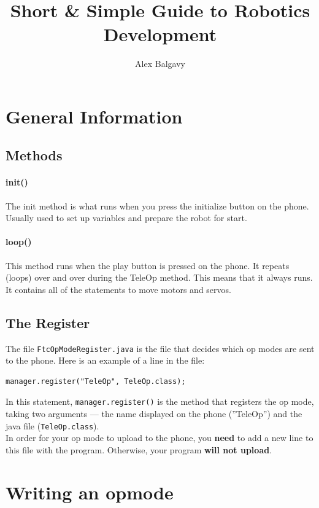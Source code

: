 \documentclass[12p,a4paper]{article}
\title{Short \& Simple Guide to Robotics Development}
\author{Alex Balgavy}
\begin{document}
\maketitle
\newpage
\tableofcontents
\newpage

\section{General Information}
\subsection{Methods}
\paragraph{init()}
The init method is what runs when you press the initialize button on the phone. Usually used to set up variables and prepare the robot for start.

\paragraph{loop()}
This method runs when the play button is pressed on the phone. It repeats (loops) over and over during the TeleOp method. This means that it always runs. It contains all of the statements to move motors and servos.

\subsection{The Register}
The file \verb!FtcOpModeRegister.java! is the file that decides which op modes are sent to the phone. Here is an example of a line in the file:

\begin{verbatim}
manager.register("TeleOp", TeleOp.class);
\end{verbatim}

In this statement, \verb!manager.register()! is the method that registers the op mode, taking two arguments --- the name displayed on the phone (''TeleOp'') and the java file (\verb!TeleOp.class!).\\
In order for your op mode to upload to the phone, you \textbf{need} to add a new line to this file with the program. Otherwise, your program \textbf{will not upload}.

\section{Writing an opmode}
\end{document}

